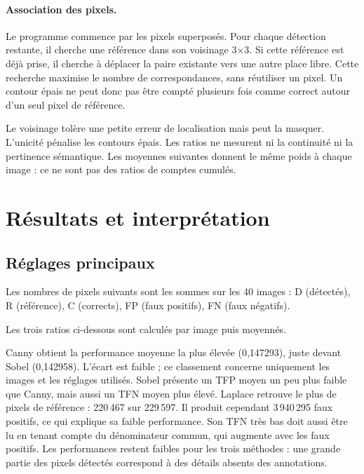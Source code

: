 \documentclass[a4paper,11pt]{article}
\begin{document}
\paragraph{Association des pixels.}
Le programme commence par les pixels superposés. Pour chaque détection restante,
il cherche une référence dans son voisinage 3$\times$3. Si cette référence est
déjà prise, il cherche à déplacer la paire existante vers une autre place libre.
Cette recherche maximise le nombre de correspondances, sans réutiliser
un pixel. Un contour épais ne peut donc pas être compté plusieurs fois comme
correct autour d'un seul pixel de référence.

Le voisinage tolère une petite erreur de localisation mais peut la masquer.
L'unicité pénalise les contours épais. Les ratios ne mesurent ni la continuité
ni la pertinence sémantique. Les moyennes suivantes donnent le même poids à
chaque image : ce ne sont pas des ratios de comptes cumulés.

\section{Résultats et interprétation}
\subsection{Réglages principaux}
Les nombres de pixels suivants sont les sommes sur les 40 images : D (détectés),
R (référence), C (corrects), FP (faux positifs), FN (faux négatifs).
\begin{center}\small\end{center}
Les trois ratios ci-dessous sont calculés par image puis moyennés.
\begin{center}\end{center}
Canny obtient la performance moyenne la plus élevée (0,147293),
juste devant Sobel (0,142958).
L'écart est faible ; ce classement concerne uniquement les images et les réglages utilisés.
Sobel présente un TFP moyen un peu plus faible que Canny, mais aussi un TFN
moyen plus élevé. Laplace retrouve le plus de pixels de référence :
220\,467 sur 229\,597. Il produit cependant 3\,940\,295 faux positifs,
ce qui explique sa faible performance. Son TFN très bas doit aussi être lu
en tenant compte du dénominateur commun, qui augmente avec les faux positifs.
Les performances restent faibles pour les trois méthodes : une grande partie
des pixels détectés correspond à des détails absents des annotations.
\end{document}
